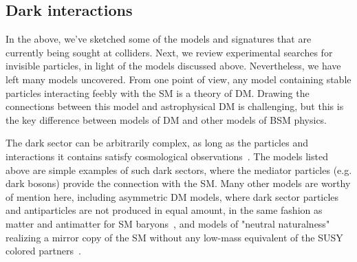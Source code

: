 \subsection{Dark interactions}
\label{sec:darkint}

In the above, we've sketched some of the models and signatures that are currently being sought at colliders. Next, we review experimental searches for invisible particles, in light of the models discussed above. Nevertheless, we have left many models uncovered. From one point of view, any model containing stable particles interacting feebly with the SM is a theory of DM. Drawing the connections between this model and astrophysical DM is challenging, but this is the key difference between models of DM and other models of BSM physics. 

The dark sector can be arbitrarily complex, as long as the particles and interactions it contains satisfy cosmological observations~\cite{Strassler:2006im}. The models listed above are simple examples of such dark sectors, where the mediator particles (e.g. dark bosons) provide the connection with the SM. Many other models are worthy of mention here, including asymmetric DM models, where dark sector particles and antiparticles are not produced in equal amount, in the same fashion as matter and antimatter for SM baryons~\cite{Zurek:2013wia}, and models of "neutral naturalness" realizing a mirror copy of the SM without any low-mass equivalent of the SUSY colored partners~\cite{Craig:2014aea}. 


